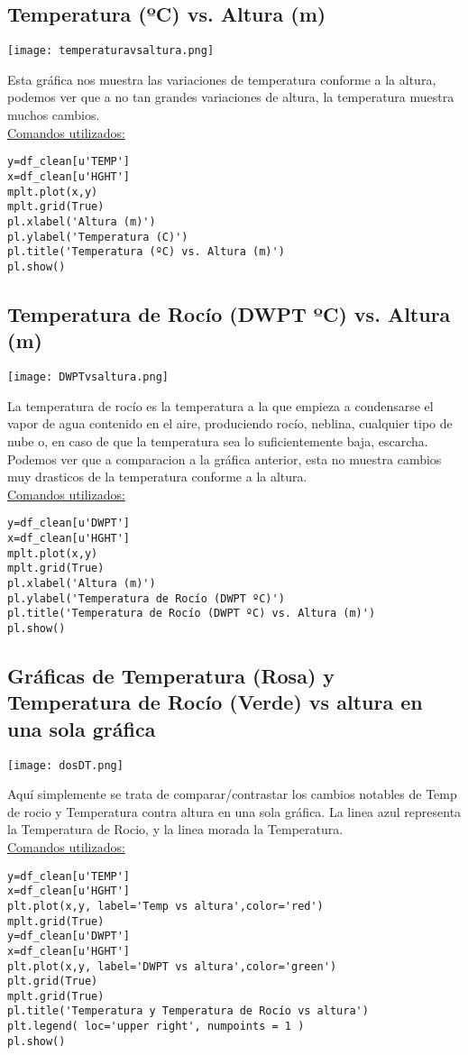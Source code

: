 \documentclass[12pt]{article}
\begin{document}
\subsection*{Temperatura (ºC) vs. Altura (m)}
\begin{center}
\texttt{[image: temperaturavsaltura.png]}
\end{center}
Esta gráfica nos muestra las variaciones de temperatura conforme a la altura, podemos ver que a no tan grandes variaciones de altura, la temperatura muestra muchos cambios. 
\\
\underline{Comandos utilizados:}
\begin{verbatim}
y=df_clean[u'TEMP']
x=df_clean[u'HGHT']
mplt.plot(x,y)
mplt.grid(True)
pl.xlabel('Altura (m)')
pl.ylabel('Temperatura (C)')
pl.title('Temperatura (ºC) vs. Altura (m)')
pl.show()
\end{verbatim}

\subsection*{Temperatura de Rocío (DWPT ºC) vs. Altura (m)}
\begin{center}
\texttt{[image: DWPTvsaltura.png]}
\end{center}
La temperatura de rocío es la temperatura a la que empieza a condensarse el vapor de agua contenido en el aire, produciendo rocío, neblina, cualquier tipo de nube o, en caso de que la temperatura sea lo suficientemente baja, escarcha. Podemos ver que a comparacion a la gráfica anterior, esta no muestra cambios muy drasticos de la temperatura conforme a la altura.
\\
\underline{Comandos utilizados:}
\begin{verbatim}
y=df_clean[u'DWPT']
x=df_clean[u'HGHT']
mplt.plot(x,y)
mplt.grid(True)
pl.xlabel('Altura (m)')
pl.ylabel('Temperatura de Rocío (DWPT ºC)')
pl.title('Temperatura de Rocío (DWPT ºC) vs. Altura (m)')
pl.show()
\end{verbatim}
\subsection*{Gráficas de Temperatura (Rosa) y Temperatura de Rocío (Verde) vs altura en una sola gráfica}
\begin{center}
\texttt{[image: dosDT.png]}
\end{center}
Aquí simplemente se trata de comparar/contrastar los cambios notables de Temp de rocio y Temperatura contra altura en una sola gráfica. La linea azul representa la Temperatura de Rocio, y la linea morada la Temperatura.
\\
\underline{Comandos utilizados:}
\begin{verbatim}
y=df_clean[u'TEMP']
x=df_clean[u'HGHT']
plt.plot(x,y, label='Temp vs altura',color='red')
mplt.grid(True)
y=df_clean[u'DWPT']
x=df_clean[u'HGHT']
plt.plot(x,y, label='DWPT vs altura',color='green')
plt.grid(True)
mplt.grid(True)
pl.title('Temperatura y Temperatura de Rocío vs altura')
plt.legend( loc='upper right', numpoints = 1 )
pl.show()
\end{verbatim}
\end{document}
